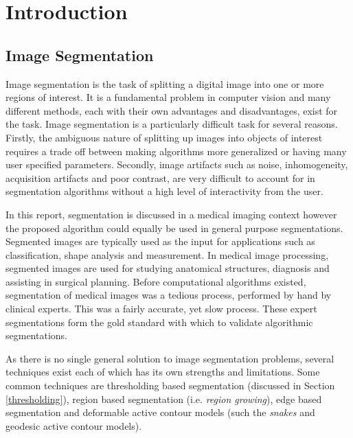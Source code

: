 \chapter{Introduction}

\section{Image Segmentation}
Image segmentation is the task of splitting a digital image into one or more regions of interest. It is a fundamental problem in computer vision and many different methods, each with their own advantages and disadvantages, exist for the task. Image segmentation is a particularly difficult task for several reasons. Firstly, the ambiguous nature of splitting up images into objects of interest requires a trade off between making algorithms more generalized or having many user specified parameters. Secondly, image artifacts such as noise, inhomogeneity, acquisition artifacts and poor contrast, are very difficult to account for in segmentation algorithms without a high level of interactivity from the user. 

In this report, segmentation is discussed in a medical imaging context however the proposed algorithm could equally be used in general purpose segmentations. Segmented images are typically used as the input for applications such as classification, shape analysis and measurement. In medical image processing, segmented images are used for studying anatomical structures, diagnosis and assisting in surgical planning. Before computational algorithms existed, segmentation of medical images was a tedious process, performed by hand by clinical experts. This was a fairly accurate, yet slow process. These expert segmentations form the gold standard with which to validate algorithmic segmentations.

As there is no single general solution to image segmentation problems, several techniques exist each of which has its own strengths and limitations. Some common techniques are thresholding based segmentation (discussed in Section \ref{thresholding}), region based segmentation (i.e. \textit{region growing}), edge based segmentation and deformable active contour models (such the \textit{snakes} \cite{kass1988sac} and geodesic active contour models).

